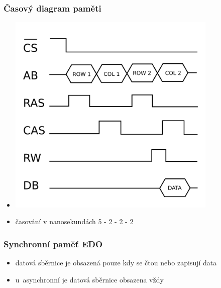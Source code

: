 \documentclass[a4paper,12pt]{article}
\providecommand{\tightlist}{%
\setlength{\itemsep}{0pt}\setlength{\parskip}{0pt}}
\begin{document}
\subsubsection{Časový diagram paměti}

\begin{itemize}
\tightlist
\item[] \includegraphics[width=10cm]{ref/casovy-diagram-dynamicke-pameti.png}
\item časování v nanosekundách 5 - 2 - 2 - 2
\end{itemize}

\subsubsection{Synchronní paměť EDO}

\begin{itemize}
\tightlist
\item datová sběrnice je obsazená pouze kdy se čtou nebo zapisují data
\item u~asynchronní je datová sběrnice obsazena vždy
\end{itemize}
\end{document}
